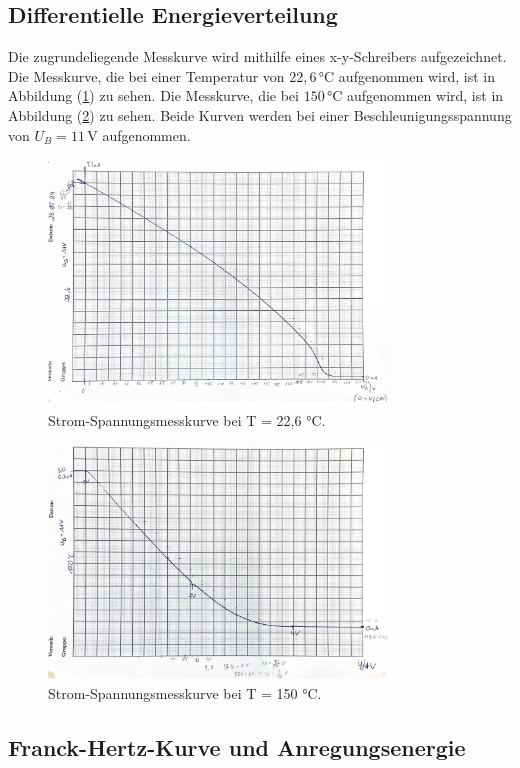 \subsection{Differentielle Energieverteilung}
Die zugrundeliegende Messkurve wird mithilfe eines 
x-y-Schreibers aufgezeichnet. Die Messkurve, die bei einer 
Temperatur von $22,6 \, °\text{C}$ aufgenommen wird, ist 
in Abbildung (\ref{fig:22,6}) zu sehen. Die Messkurve, die bei 
$150 \, °\text{C}$ aufgenommen wird, ist in Abbildung 
(\ref{fig:150}) zu sehen. Beide Kurven werden bei einer
Beschleunigungsspannung von $U_B = 11 \, \unit{\volt}$
aufgenommen. 
\begin{figure}
    \centering
    \includegraphics[width=0.8\textwidth]{content/Bilder/22,6.jpeg}
    \caption{Strom-Spannungsmesskurve bei T = 22,6 °C.}
    \label{fig:22,6}
\end{figure}
\begin{figure}
    \centering
    \includegraphics[width=0.8\textwidth]{content/Bilder/150.jpeg}
    \caption{Strom-Spannungsmesskurve bei T = 150 °C.}
    \label{fig:150}
\end{figure}

\subsection{Franck-Hertz-Kurve und Anregungsenergie}

